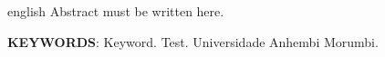 \begin{resumo}
 \begin{otherlanguage*}{english}
   Abstract must be written here.

   \vspace{\onelineskip}
 
   \noindent 
   \textbf{KEYWORDS}: Keyword. Test. Universidade Anhembi Morumbi.
 \end{otherlanguage*}
\end{resumo}

